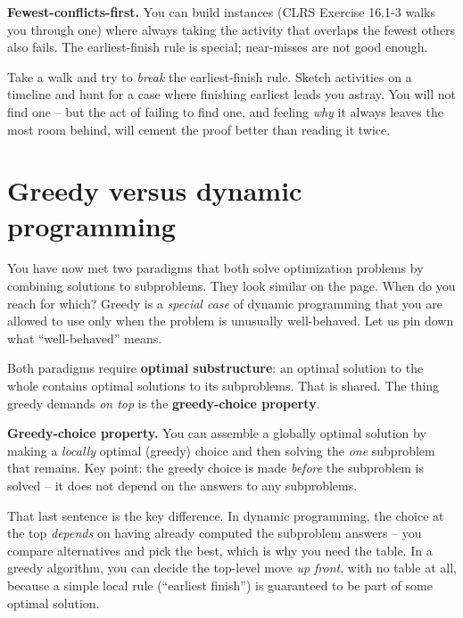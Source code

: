 \textbf{Fewest-conflicts-first.} You can build instances (CLRS Exercise 16.1-3
walks you through one) where always taking the activity that overlaps the fewest
others also fails. The earliest-finish rule is special; near-misses are not good
enough.

\begin{walkbox}
Take a walk and try to \emph{break} the earliest-finish rule. Sketch activities
on a timeline and hunt for a case where finishing earliest leads you astray. You
will not find one -- but the act of failing to find one, and feeling \emph{why}
it always leaves the most room behind, will cement the proof better than reading
it twice.
\end{walkbox}

\section{Greedy versus dynamic programming}

You have now met two paradigms that both solve optimization problems by combining
solutions to subproblems. They look similar on the page. When do you reach for
which? Greedy is a \emph{special case} of dynamic
programming that you are allowed to use only when the problem is unusually
well-behaved. Let us pin down what ``well-behaved'' means.

Both paradigms require \textbf{optimal substructure}: an optimal solution to the
whole contains optimal solutions to its subproblems. That is shared. The thing
greedy demands \emph{on top} is the \textbf{greedy-choice property}.

\begin{focusbox}
\textbf{Greedy-choice property.} You can assemble a globally optimal solution by
making a \emph{locally} optimal (greedy) choice and then solving the \emph{one}
subproblem that remains. Key point: the greedy choice is made \emph{before} the
subproblem is solved -- it does not depend on the answers to any subproblems.
\end{focusbox}

That last sentence is the key difference. In dynamic programming, the choice at
the top \emph{depends} on having already computed the subproblem answers -- you
compare alternatives and pick the best, which is why you need the table. In a
greedy algorithm, you can decide the top-level move \emph{up front}, with no table
at all, because a simple local rule (``earliest finish'') is guaranteed to be
part of some optimal solution.

